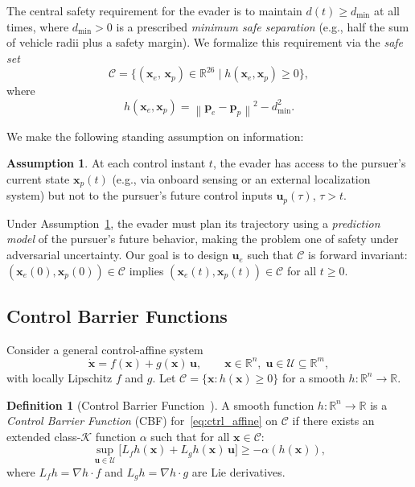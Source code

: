\documentclass[lettersize,journal]{IEEEtran}
\theoremstyle{definition}
\newtheorem{definition}{Definition}
\newtheorem{assumption}{Assumption}
\theoremstyle{remark}
\newcommand{\R}{\mathbb{R}}
\newcommand{\norm}[1]{\left\| #1 \right\|}
\newcommand{\vect}[1]{\bm{#1}}
\begin{document}
The central safety requirement for the evader is to maintain
$d(t) \geq d_{\min}$ at all times, where $d_{\min} > 0$ is a
prescribed \emph{minimum safe separation} (e.g., half the sum of
vehicle radii plus a safety margin).
We formalize this requirement via the \emph{safe set}
\begin{equation}
    \mathcal{C} = \bigl\{
        (\vect{x}_e,\,\vect{x}_p) \in \R^{26} \;\big|\;
        h(\vect{x}_e,\vect{x}_p) \geq 0
    \bigr\},
    \label{eq:safe_set}
\end{equation}
where
\begin{equation}
    h(\vect{x}_e,\vect{x}_p)
        = \norm{\vect{p}_e - \vect{p}_p}^2 - d_{\min}^2.
    \label{eq:barrier}
\end{equation}

We make the following standing assumption on information:
\begin{assumption}
\label{ass:info}
At each control instant $t$, the evader has access to the pursuer's
current state $\vect{x}_p(t)$ (e.g., via onboard sensing or an
external localization system) but not to the pursuer's future control
inputs $\vect{u}_p(\tau)$, $\tau > t$.
\end{assumption}

Under Assumption~\ref{ass:info}, the evader must plan its trajectory
using a \emph{prediction model} of the pursuer's future behavior,
making the problem one of safety under adversarial uncertainty.
Our goal is to design $\vect{u}_e$ such that $\mathcal{C}$ is
forward invariant: $(\vect{x}_e(0),\vect{x}_p(0)) \in \mathcal{C}$
implies $(\vect{x}_e(t),\vect{x}_p(t)) \in \mathcal{C}$ for all
$t \geq 0$.

\subsection{Control Barrier Functions}
\label{sec:cbf}

Consider a general control-affine system
\begin{equation}
    \dot{\vect{x}} = f(\vect{x}) + g(\vect{x})\,\vect{u},
    \qquad \vect{x}\in\R^n,\;\vect{u}\in\mathcal{U}\subseteq\R^m,
    \label{eq:ctrl_affine}
\end{equation}
with locally Lipschitz $f$ and $g$.
Let $\mathcal{C} = \{\vect{x} : h(\vect{x}) \geq 0\}$ for a smooth
$h:\R^n\to\R$.

\begin{definition}[Control Barrier Function~\cite{ames2019control}]
A smooth function $h:\R^n\to\R$ is a \emph{Control Barrier Function}
(CBF) for~\eqref{eq:ctrl_affine} on $\mathcal{C}$ if there exists an
extended class-$\mathcal{K}$ function $\alpha$ such that for all
$\vect{x}\in\mathcal{C}$:
\begin{equation}
    \sup_{\vect{u}\in\mathcal{U}}\bigl[
        L_f h(\vect{x}) + L_g h(\vect{x})\,\vect{u}
    \bigr] \geq -\alpha(h(\vect{x})),
    \label{eq:cbf_def}
\end{equation}
where $L_f h = \nabla h \cdot f$ and $L_g h = \nabla h \cdot g$
are Lie derivatives.
\end{definition}
\end{document}
